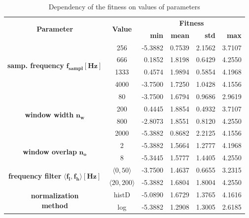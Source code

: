 \documentclass[a4paper]{IEEEtran}
\begin{document}
\begin{table}[!h]
	\caption{Dependency of the fitness on values of parameters}
	\centering
	\begin{tabular}{|c|c||r|r|r|r|}
		\hline
			\multirow{2}{*}{\textbf{Parameter}} & 
			\multirow{2}{*}{\textbf{Value}} & 
			\multicolumn{4}{c|}{\textbf{Fitness}} \\ 
		\cline{3-6}
			& &
			\textbf{min} &
			\textbf{mean} &
			\textbf{std} &
			\textbf{max} \\
		\hline
		\hline
			\multirow{4}{*}{\parbox[c]{20mm}{\centering\textbf{samp. frequency}\\ $ \mathbf{f_{sampl}[Hz]} $}}
			& 256 & -5.3882 & 0.7539 & 2.1562 & 3.7107\\ \cline{2-6}
			& 666 & 0.1852 & 1.8198 & 0.6429 & 4.2550\\ \cline{2-6}
			& 1333 & 0.4574 & 1.9894 & 0.5854 & 4.1968\\ \cline{2-6}
			& 4000 & -3.7500 & 1.7250 & 1.0428 & 4.1556\\
		\hline
			\multirow{4}{*}{\parbox[c]{20mm}{\centering\textbf{window width}\\ $ \mathbf{n_w} $}}
			& 80 & -3.7500 & 1.6794 & 0.9686 & 2.9619\\ \cline{2-6}
			& 200 & 0.4445 & 1.8854 & 0.4932 & 3.7107\\ \cline{2-6}
			& 800 & -2.8073 & 1.8551 & 0.8120 & 4.2550\\ \cline{2-6}
			& 2000 & -5.3882 & 0.8682 & 2.2125 & 4.1556\\ 
		\hline
			\multirow{2}{*}{\parbox[c]{20mm}{\centering\textbf{window overlap}\\ $ \mathbf{n_o} $}}
			& 2 & -5.3882 & 1.5664 & 1.2777 & 4.1968\\ \cline{2-6}
			& 8 & -5.3445 & 1.5777 & 1.4405 & 4.2550\\
		\hline		
			\multirow{2}{*}{\parbox[c]{20mm}{\centering\textbf{frequency filter}\\$\mathbf{\langle f_l,f_h \rangle[Hz]}$}}
			& $ \langle 0, 50 \rangle $ & -3.7500 & 1.4637 & 0.6655 & 3.2315\\ \cline{2-6}
			& $ \langle 20, 200 \rangle $ & -5.3882 & 1.6804 & 1.8004 & 4.2550\\
		\hline
			\multirow{4}{*}{\parbox[c]{20mm}{\centering\textbf{normalization}\\ \textbf{method}}}
			& histD & -5.0890 & 1.6729 & 1.3765 & 4.1616\\ \cline{2-6}
			& log & -5.3882 & 1.2908 & 1.3005 & 2.6185\\ \cline{2-6}

\end{tabular}
\end{table}
\end{document}
